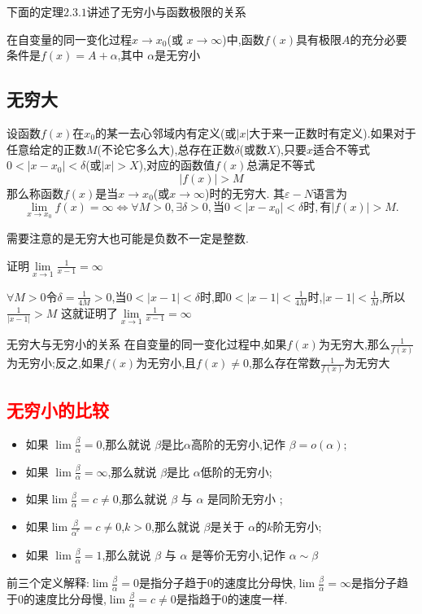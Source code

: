 \documentclass[12pt, a4paper, oneside, UTF8]{ctexbook}  %
\begin{document}
下面的定理$2.3.1$讲述了无穷小与函数极限的关系
\begin{them}{}{}
    在自变量的同一变化过程$x\to x_0$(或 $x\to\infty$)中,函数$f(x)$具有极限$A$的充分必要条件是$f(x)=A+\alpha$,其中 $\alpha$是无穷小
\end{them}

\subsection{无穷大}
\begin{defn}{}{}
    设函数$f(x)$在$x_0$的某一去心邻域内有定义(或$|x|$大于来一正数时有定义).如果对于任意给定的正数$M$(不论它多么大),总存在正数$\delta$(或数$X$),只要$x$适合不等式$0<|x-x_0|<\delta$(或$|x|>X$),对应的函数值$f(x)$总满足不等式
    $$
        |f(x)|>M
    $$
    那么称函数$f(x)$是当$x\to x_0$(或$x\to\infty$)时的无穷大.
    其$\varepsilon-N$语言为
    $$
        \lim\limits_{x\to x_0}f(x)= \infty \Leftrightarrow\forall M >0,\exists\delta>0,\text{当}0<|x-x_0|<\delta\text{时},\text{有}|f(x)|>M.
    $$
\end{defn}
需要注意的是无穷大也可能是负数不一定是整数.
\begin{problem}
证明$\underset{x\rightarrow1}{\operatorname*{lim}}\frac{1}{x-1}=\infty $
\end{problem}
\begin{solution}
    $\forall M>0$令$\delta=\frac{1}{4M}>0$,当$0<|x-1|<\delta$时,即$0<|x-1|<\frac{1}{4M}$时,$|x-1|<\frac{1}{M}$,所以$\frac{1}{|x-1|}>M$
    这就证明了$\underset{x\rightarrow1}{\operatorname*{lim}}\frac{1}{x-1}=\infty$
\end{solution}
\begin{them}{无穷大与无穷小的关系}{}
    在自变量的同一变化过程中,如果$f(x)$为无穷大,那么$\frac{1}{f(x)}$为无穷小;反之,如果$f(x)$为无穷小,且$f(x) \neq 0$,那么存在常数$\frac{1}{f(x)}为无穷大$
\end{them}

\subsection{\textcolor{red}{无穷小的比较}}
\begin{defn}{}{}
    \begin{itemize}
        \item 如果 $\lim \frac{\beta}{\alpha} =0$,那么就说 $\beta$是比$\alpha$高阶的无穷小,记作 $\beta=o(\alpha);$
        \item  如果 $\lim \frac\beta\alpha  =\infty$,那么就说 $\beta$是比 $\alpha$低阶的无穷小;
        \item 如果$\lim\frac{\beta}{\alpha} =c\neq 0$,那么就说 $\beta$ 与 $\alpha$ 是同阶无穷小 ;
        \item 如果$\lim\frac{\beta}{\alpha^{^k}} =c \neq 0$,$k > 0$,那么就说 $\beta$是关于 $\alpha$的$k$阶无穷小;
        \item 如果 $\lim \frac\beta\alpha = 1$,那么就说 $\beta$ 与 $\alpha$ 是等价无穷小,记作 $\alpha\sim\beta$
    \end{itemize}
\end{defn}
前三个定义解释:$\lim \frac{\beta}{\alpha} =0$是指分子趋于$0$的速度比分母快,$\lim \frac\beta\alpha  =\infty$是指分子趋于$0$的速度比分母慢,$\lim\frac{\beta}{\alpha} =c\neq 0$是指趋于$0$的速度一样.
\end{document}
